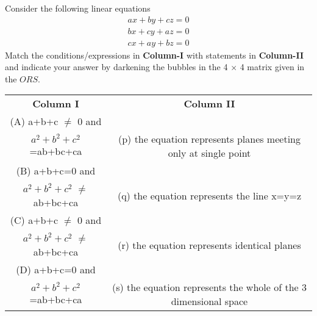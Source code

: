 \clearpage
\item Consider the following linear equations
\begin{align*}
ax+by+cz=0
\end{align*}
\begin{align*}
bx+cy+az=0
\end{align*}
\begin{align*}
cx+ay+bz=0
\end{align*}
Match the conditions/expressions in \textbf{Column-I} with statements in \textbf{Column-II} and indicate your answer by darkening the bubbles in the 4 $\times$ 4 matrix given in the $ORS$.
\begin{table}[ht!]
\centering
\begin{tabular}{c c} 
 \textbf{Column I} & \textbf{Column II}\\ [0.5ex] 
 (A) a+b+c $\neq$ 0 and\\
     $a^2+b^2+c^2$=ab+bc+ca                             &(p) the equation represents planes meeting 
                                                             only at single point\\ 
 (B) a+b+c=0 and\\
  $a^2+b^2+c^2$ $\neq$ ab+bc+ca                         &(q) the equation represents the line x=y=z\\
 (C) a+b+c $\neq$ 0 and\\
  $a^2+b^2+c^2$ $\neq$ ab+bc+ca                         &(r) the equation represents identical planes\\
 (D) a+b+c=0 and\\
  $a^2+b^2+c^2$=ab+bc+ca                                &(s) the equation represents the whole of the 
                                                             3 dimensional space\\[1ex] 
\end{tabular}
\end{table}

